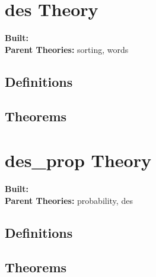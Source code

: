 \documentclass[11pt, twoside]{article}
\begin{document}


\tableofcontents
\cleardoublepage
\HOLpagestyle

\section{des Theory}
\begin{flushleft}
\textbf{Built:} \HOLdesDate \\[2pt]
\textbf{Parent Theories:} sorting, words
\end{flushleft}


\subsection{Definitions}

\HOLdesDefinitions

\subsection{Theorems}

\HOLdesTheorems

\section{des_prop Theory}
\begin{flushleft}
\textbf{Built:} \HOLdesXXpropDate \\[2pt]
\textbf{Parent Theories:} probability, des
\end{flushleft}


\subsection{Definitions}

\HOLdesXXpropDefinitions

\subsection{Theorems}

\HOLdesXXpropTheorems
\HOLindex
\end{document}
